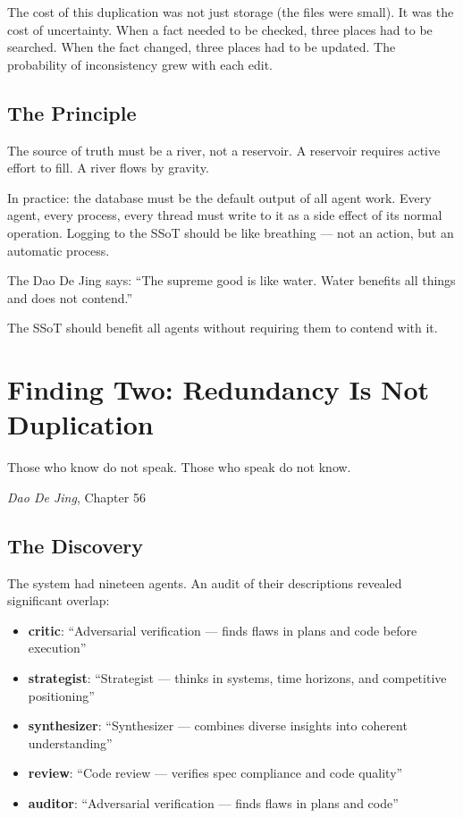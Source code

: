 \documentclass[12pt,a4paper,oneside]{book}
\begin{document}
The cost of this duplication was not just storage (the files were small). It was the cost of uncertainty. When a fact needed to be checked, three places had to be searched. When the fact changed, three places had to be updated. The probability of inconsistency grew with each edit.

\section{The Principle}

The source of truth must be a river, not a reservoir. A reservoir requires active effort to fill. A river flows by gravity.

In practice: the database must be the default output of all agent work. Every agent, every process, every thread must write to it as a side effect of its normal operation. Logging to the SSoT should be like breathing --- not an action, but an automatic process.

The Dao De Jing says: \enquote{The supreme good is like water. Water benefits all things and does not contend.}

The SSoT should benefit all agents without requiring them to contend with it.

\chapter{Finding Two: Redundancy Is Not Duplication}

\epigraph{Those who know do not speak. Those who speak do not know.}{\textit{Dao De Jing}, Chapter 56}

\section{The Discovery}

The system had nineteen agents. An audit of their descriptions revealed significant overlap:

\begin{itemize}
  \item \textbf{critic}: \enquote{Adversarial verification --- finds flaws in plans and code before execution}
  \item \textbf{strategist}: \enquote{Strategist --- thinks in systems, time horizons, and competitive positioning}
  \item \textbf{synthesizer}: \enquote{Synthesizer --- combines diverse insights into coherent understanding}
  \item \textbf{review}: \enquote{Code review --- verifies spec compliance and code quality}
  \item \textbf{auditor}: \enquote{Adversarial verification --- finds flaws in plans and code}
\end{itemize}
\end{document}
